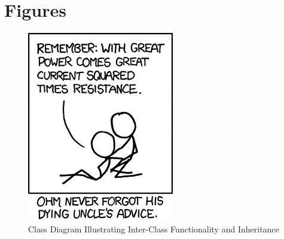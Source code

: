 \section{Figures}
\label{FiguresAppendix}

\begin{figure}[hbp]
  \centering
  \captionsetup{justification=centering}
  \centerline{\includegraphics[width=0.5\linewidth]{Figures/fig1.jpg}}
  \caption{Class Diagram Illustrating Inter-Class Functionality and Inheritance}
  \label{inheritanceDiagram}
\end{figure}
